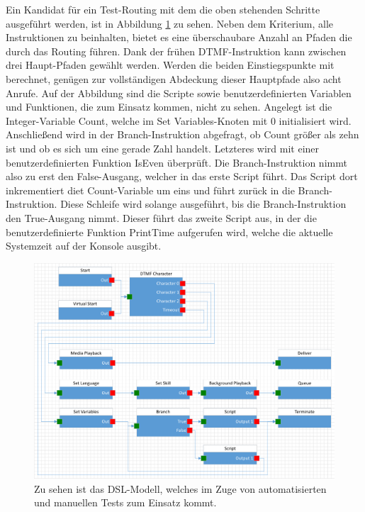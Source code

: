 Ein Kandidat für ein Test-Routing mit dem die oben stehenden Schritte ausgeführt werden, ist in Abbildung \ref{fig:TestRouting} zu sehen. Neben dem Kriterium, alle Instruktionen zu beinhalten, bietet es eine überschaubare Anzahl an Pfaden die durch das Routing  führen. Dank der frühen DTMF-Instruktion kann zwischen drei Haupt-Pfaden gewählt werden. Werden die beiden Einstiegspunkte mit berechnet, genügen zur vollständigen  Abdeckung dieser Hauptpfade also acht Anrufe. Auf der Abbildung sind die Scripte sowie benutzerdefinierten Variablen und Funktionen, die zum Einsatz kommen, nicht zu sehen. Angelegt ist die Integer-Variable Count, welche im Set Variables-Knoten mit 0 initialisiert wird. Anschließend wird in der Branch-Instruktion abgefragt, ob Count größer als zehn ist und ob es sich um eine gerade Zahl handelt. Letzteres wird mit einer benutzerdefinierten Funktion IsEven überprüft. Die Branch-Instruktion nimmt also zu erst den False-Ausgang, welcher in das erste Script führt. Das Script dort inkrementiert diet Count-Variable um eins und führt zurück in die Branch-Instruktion. Diese Schleife wird solange ausgeführt, bis die Branch-Instruktion den True-Ausgang nimmt. Dieser führt das zweite Script aus, in der die benutzerdefinierte Funktion PrintTime aufgerufen wird, welche die aktuelle Systemzeit auf der Konsole ausgibt.

\begin{figure} %
	\centering
		\includegraphics[width=\textwidth]{img/TestRouting.png}
	\caption[DSL-Modell für manuelle Tests]{Zu sehen ist das DSL-Modell, welches im Zuge von automatisierten und manuellen  Tests zum Einsatz kommt.}
	\label{fig:TestRouting}
\end{figure}

